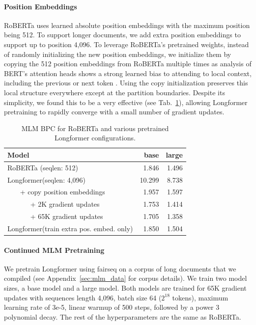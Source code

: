 \documentclass[11pt,a4paper]{article}
\newcommand{\model}{Longformer\xspace}
\newcommand{\seqlen}{4,096\xspace}
\begin{document}
\paragraph{Position Embeddings}
RoBERTa uses learned absolute position embeddings with the maximum 
position being 512. To support longer documents, we add extra position embeddings to support up to position 4,096. 
To leverage RoBERTa's pretrained weights, instead of randomly initializing the new position embeddings, we initialize them by copying the 512 position
embeddings from RoBERTa multiple times as analysis of BERT's attention heads shows a strong learned bias to attending to local context, including the previous or next token \cite{Clark2019WhatDB}.  Using the copy initialization preserves this local structure everywhere except at the partition boundaries.
Despite its simplicity, we found this to be a very effective (see Tab.~\ref{tab:roberta}), allowing \model pretraining to rapidly converge with a small number of gradient updates.

\begin{table}[t]
    \centering
    \small
    \begin{tabular}{@{}lrr@{}}
    \toprule
    Model &  base & large\\
    \midrule
    RoBERTa (seqlen: 512)  & 1.846 & 1.496 \\
    \model  (seqlen: \seqlen) & 10.299 & 8.738 \\
    ~~~ + copy position embeddings & 1.957 & 1.597\\
    ~~~~~~ + 2K gradient updates & 1.753 & 1.414 \\
    ~~~~~~ + 65K gradient updates & 1.705 & 1.358\\
    \model (train extra pos. embed. only) & 1.850 & 1.504 \\
    \bottomrule
    \end{tabular}
    \caption{MLM BPC for RoBERTa and various pretrained \model configurations. 
    }
    \label{tab:roberta}
\end{table}

\paragraph{Continued MLM Pretraining}

We pretrain \model using fairseq \cite{ott2019fairseq} on a corpus of long documents that we compiled (see Appendix~\ref{sec:mlm_data} for corpus details).
We train two model sizes, a base model and a large model.
Both models are trained for 65K gradient updates with sequences length \seqlen, batch size 64 ($2^{18}$ tokens), maximum learning rate of 3e-5, linear warmup of 500 steps, followed by a power 3 polynomial decay. The rest of the hyperparameters are the same as RoBERTa. 
\end{document}
